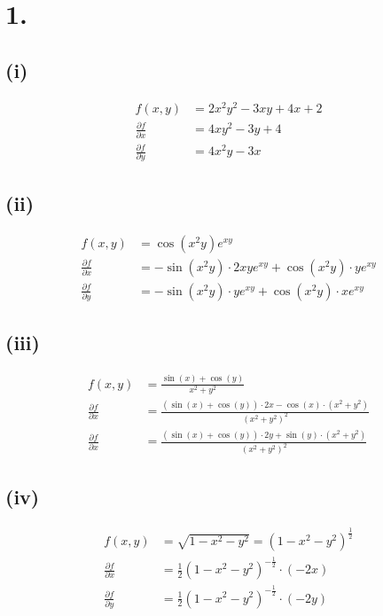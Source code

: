 \documentclass[a4paper]{scrartcl}
\title{\titleinfo}
\author{Elena Noll, Sven-Hendrik Haase, Arne Struck}
\date{\today}
\begin{document}
\maketitle
\notag


\section{1.}
\subsection{(i)}
\begin{align}
f(x,y) &= 2x^2y^2-3xy+4x+2 \\
\frac {\partial f} {\partial x} &= 4xy^2 - 3y+4 \\
\frac {\partial f} {\partial y} &= 4x^2y - 3x
\end{align}

\subsection{(ii)}
\begin{align}
f(x,y) &= \cos(x^2 y)e^{xy} \\
\frac {\partial f} {\partial x} &= -\sin(x^2 y) \cdot 2xy e^{xy} + \cos(x^2 y) \cdot ye^{xy} \\
\frac {\partial f} {\partial y} &= -\sin(x^2 y) \cdot ye^{xy} + \cos(x^2 y) \cdot xe^{xy}
\end{align}

\subsection{(iii)}
\begin{align}
f(x,y) &= \frac {\sin(x) + \cos(y)} {x^2+y^2} \\
\frac {\partial f} {\partial x} &= \frac {(\sin(x) + \cos(y)) \cdot 2x - \cos(x) \cdot (x^2+y^2)} {(x^2+y^2)^2} \\
\frac {\partial f} {\partial x} &= \frac {(\sin(x) + \cos(y)) \cdot 2y + \sin(y) \cdot (x^2+y^2)} {(x^2+y^2)^2}
\end{align}

\subsection{(iv)}
\begin{align}
f(x,y) &= \sqrt{1-x^2-y^2} = (1-x^2-y^2)^{\frac 1 2} \\
\frac {\partial f} {\partial x} &= \frac 1 2 (1-x^2-y^2)^{- \frac 1 2} \cdot (-2x) \\
\frac {\partial f} {\partial y} &= \frac 1 2 (1-x^2-y^2)^{- \frac 1 2} \cdot (-2y)
\end{align}
\end{document}
